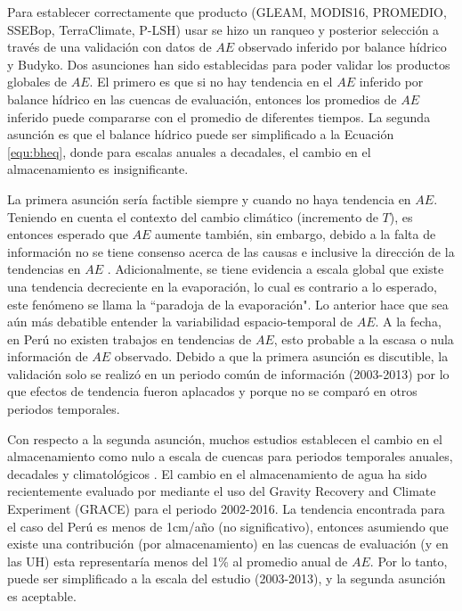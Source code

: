 \documentclass[12pt]{article}
\begin{document}
\thispagestyle{empty}

Para establecer correctamente que producto (GLEAM, MODIS16, PROMEDIO, SSEBop, TerraClimate, P-LSH) usar se hizo un ranqueo y posterior selección a través de una validación con datos de $AE$ observado inferido por balance hídrico y Budyko. Dos asunciones han sido establecidas para poder validar los productos globales de $AE$. El primero es que si no hay tendencia en el $AE$ inferido por balance hídrico en las cuencas de evaluación, entonces los promedios de $AE$ inferido puede compararse con el promedio de diferentes tiempos. La segunda asunción es que el balance hídrico puede ser simplificado a la Ecuación \ref{equ:bheq}, donde para escalas anuales a decadales, el cambio en el almacenamiento es insignificante.

La primera asunción sería factible siempre y cuando no haya tendencia en $AE$. Teniendo en cuenta el contexto del cambio climático (incremento de $T$), es entonces esperado que $AE$ aumente también, sin embargo, debido a la falta de información no se tiene consenso acerca de las causas e inclusive la dirección de la tendencias en $AE$ \citep{hobbins2004trends,cong2009does,wang2011trends,miralles2016wacmos,douville2013anthropogenic,zhang2016multi}. Adicionalmente, se tiene evidencia a escala global que existe una tendencia decreciente en la evaporación, lo cual es contrario a lo esperado, este fenómeno se llama la “paradoja de la evaporación". Lo anterior hace que sea aún más debatible entender la variabilidad espacio-temporal de $AE$. A la fecha, en Perú no existen trabajos en tendencias de $AE$, esto probable a la escasa o nula información de $AE$ observado. Debido a que la primera asunción es discutible, la validación solo se realizó en un periodo común de información (2003-2013) por lo que efectos de tendencia fueron aplacados y porque no se comparó en otros periodos temporales.

Con respecto a la segunda asunción, muchos estudios establecen el cambio en el almacenamiento como nulo a escala de cuencas para periodos temporales anuales, decadales y climatológicos \citep{Budyko1961,Fu1981,Zhang2008,Wang2014,Singh2015}. El cambio en el almacenamiento de agua ha sido recientemente evaluado por \citet{rodell2018emerging} mediante el uso del Gravity Recovery and Climate Experiment (GRACE) para el periodo 2002-2016. La tendencia encontrada para el caso del Perú es menos de 1cm/año (no significativo), entonces asumiendo que existe una contribución (por almacenamiento) en las cuencas de evaluación (y en las UH) esta representaría menos del 1\% al promedio anual de $AE$. Por lo tanto, puede ser simplificado a la escala del estudio (2003-2013), y la segunda asunción es aceptable.
\end{document}
